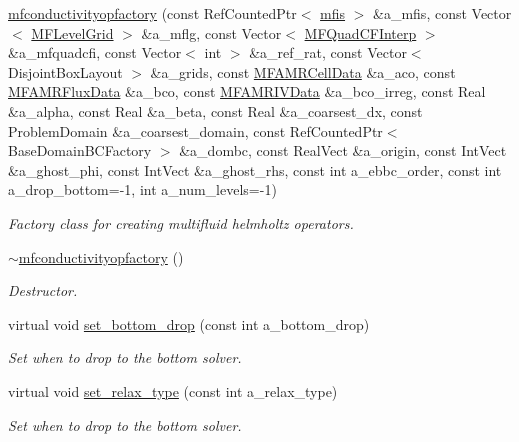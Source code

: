 \begin{DoxyCompactItemize}
\item 
\hyperlink{classmfconductivityopfactory_a0d3122da3273434620661ff6e64742ee}{mfconductivityopfactory} (const Ref\+Counted\+Ptr$<$ \hyperlink{classmfis}{mfis} $>$ \&a\+\_\+mfis, const Vector$<$ \hyperlink{classMFLevelGrid}{M\+F\+Level\+Grid} $>$ \&a\+\_\+mflg, const Vector$<$ \hyperlink{classMFQuadCFInterp}{M\+F\+Quad\+C\+F\+Interp} $>$ \&a\+\_\+mfquadcfi, const Vector$<$ int $>$ \&a\+\_\+ref\+\_\+rat, const Vector$<$ Disjoint\+Box\+Layout $>$ \&a\+\_\+grids, const \hyperlink{type__definitions_8H_aced885351d40daa466564acbee4042d3}{M\+F\+A\+M\+R\+Cell\+Data} \&a\+\_\+aco, const \hyperlink{type__definitions_8H_a4033d82364b7e6655b58257749d7881f}{M\+F\+A\+M\+R\+Flux\+Data} \&a\+\_\+bco, const \hyperlink{type__definitions_8H_a559707b00625e419df1a59d9501220de}{M\+F\+A\+M\+R\+I\+V\+Data} \&a\+\_\+bco\+\_\+irreg, const Real \&a\+\_\+alpha, const Real \&a\+\_\+beta, const Real \&a\+\_\+coarsest\+\_\+dx, const Problem\+Domain \&a\+\_\+coarsest\+\_\+domain, const Ref\+Counted\+Ptr$<$ Base\+Domain\+B\+C\+Factory $>$ \&a\+\_\+dombc, const Real\+Vect \&a\+\_\+origin, const Int\+Vect \&a\+\_\+ghost\+\_\+phi, const Int\+Vect \&a\+\_\+ghost\+\_\+rhs, const int a\+\_\+ebbc\+\_\+order, const int a\+\_\+drop\+\_\+bottom=-\/1, int a\+\_\+num\+\_\+levels=-\/1)
\begin{DoxyCompactList}\small\item\em Factory class for creating multifluid helmholtz operators. \end{DoxyCompactList}\item 
\hyperlink{classmfconductivityopfactory_ac827042c7836def1e17a008585ec863e}{$\sim$mfconductivityopfactory} ()
\begin{DoxyCompactList}\small\item\em Destructor. \end{DoxyCompactList}\item 
virtual void \hyperlink{classmfconductivityopfactory_a10886ced46a2ca9c89fc43928a0393cf}{set\+\_\+bottom\+\_\+drop} (const int a\+\_\+bottom\+\_\+drop)
\begin{DoxyCompactList}\small\item\em Set when to drop to the bottom solver. \end{DoxyCompactList}\item 
virtual void \hyperlink{classmfconductivityopfactory_ad7c83f478136ae769674cb0883429514}{set\+\_\+relax\+\_\+type} (const int a\+\_\+relax\+\_\+type)
\begin{DoxyCompactList}\small\item\em Set when to drop to the bottom solver. \end{DoxyCompactList}\item 

\end{DoxyCompactItemize}

